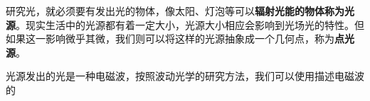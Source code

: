 
研究光，就必须要有发出光的物体，像太阳、灯泡等可以\textbf{辐射光能的物体称为光源}。现实生活中的光源都有着一定大小，光源大小相应会影响到光场光的特性。但如果这一影响微乎其微，我们则可以将这样的光源抽象成一个几何点，称为\textbf{点光源}。

光源发出的光是一种电磁波，按照波动光学的研究方法，我们可以使用描述电磁波的
